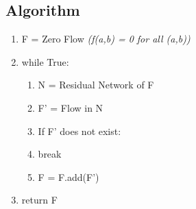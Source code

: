 \subsection{Algorithm}
\begin{enumerate}[label=\Alph*]
    \item F = Zero Flow \emph{(f(a,b) = 0 for all (a,b))}
    \item while True: 
\begin{enumerate}[label=\arabic*]
    \item N = Residual Network of F
    \item F' = Flow in N
    \item If F' does not exist:
    \item [] \quad break
    \item F = F.add(F')
\end{enumerate}  
\item return F
\end{enumerate}